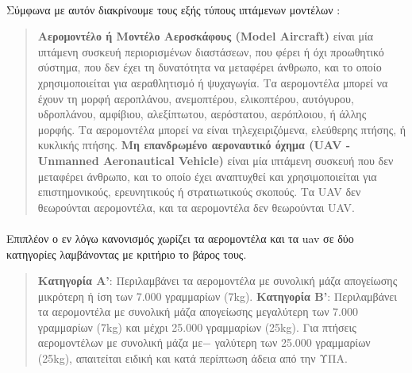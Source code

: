 \documentclass[a4paper, 12pt, twoside]{report}
\begin{document}
{{{{{{			\paragraph{}{Σύμφωνα με αυτόν διακρίνουμε τους εξής τύπους ιπτάμενων μοντέλων :
			\begin{quote}
				\textbf{Αερομοντέλο ή Μοντέλο Αεροσκάφους (Model Aircraft)} είναι μία ιπτάμενη συσκευή περιορισμένων διαστάσεων, που φέρει ή όχι προωθητικό σύστημα, που δεν έχει τη δυνατότητα να μεταφέρει άνθρωπο, και το οποίο χρησιμοποιείται για αεραθλητισμό ή ψυχαγωγία. Τα αερομοντέλα μπορεί να έχουν τη μορφή αεροπλάνου, ανεμοπτέρου, ελικοπτέρου, αυτόγυρου, υδροπλάνου, αμφίβιου, αλεξίπτωτου, αερόστατου, αερόπλοιου, ή άλλης μορφής. Τα αερομοντέλα μπορεί να είναι τηλεχειριζόμενα, ελεύθερης πτήσης, ή κυκλικής πτήσης.\linebreak
				\textbf{Μη επανδρωμένο αεροναυτικό όχημα (UAV - Unmanned Aeronautical Vehicle)} είναι μία ιπτάμενη συσκευή που δεν μεταφέρει άνθρωπο, και το οποίο έχει αναπτυχθεί και χρησιμοποιείται για επιστημονικούς, ερευνητικούς ή στρατιωτικούς σκοπούς. Τα UAV δεν θεωρούνται αερομοντέλα, και τα αερομοντέλα δεν θεωρούνται UAV.			
			\end{quote}
			}
			\paragraph{}{Επιπλέον ο εν λόγω κανονισμός χωρίζει τα αερομοντέλα και τα uav σε δύο κατηγορίες λαμβάνοντας με κριτήριο το βάρος τους.
			\begin{quote}
				\textbf{Κατηγορία Α'}: Περιλαμβάνει τα αερομοντέλα με συνολική μάζα απογείωσης μικρότερη ή ίση των 7.000 γραμμαρίων (7kg).\linebreak
				\textbf{Κατηγορία Β'}: Περιλαμβάνει τα αερομοντέλα με συνολική μάζα απογείωσης μεγαλύτερη των 7.000 γραμμαρίων (7kg) και μέχρι 25.000 γραμμαρίων (25kg).\linebreak
				Για πτήσεις αερομοντέλων με συνολική μάζα με−
γαλύτερη των 25.000 γραμμαρίων (25kg), απαιτείται ειδική και κατά περίπτωση άδεια από την ΥΠΑ.
			\end{quote}
			}
			
}}}}}}
\end{document}
